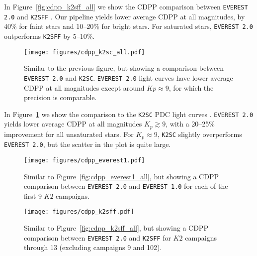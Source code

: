 \documentclass[]{emulateapj}
\newcommand{\Kp}{\ensuremath{Kp}}
\newcommand{\edited}[1]{{\color{red} #1}}
\begin{document}
In Figure~\ref{fig:cdpp_k2sff_all} we show the CDPP comparison between \texttt{EVEREST 2.0}
and \texttt{K2SFF} \citep{Vanderburg14,VanderburgJohnson14}. Our pipeline yields
lower average CDPP at all magnitudes, by 40\% for faint stars and 10--20\% for bright
stars. For saturated stars, \texttt{EVEREST 2.0} outperforms \texttt{K2SFF} by 5--10\%.

\begin{figure}[hbt]
  \begin{center}
      \texttt{[image: figures/cdpp\_k2sc\_all.pdf]}
       \caption{Similar to the previous figure, but showing a comparison between \texttt{EVEREST 2.0} and \texttt{K2SC}.
       \texttt{EVEREST 2.0} light curves have lower average CDPP at all magnitudes except around $\Kp \approx 9$, for which
       the precision is comparable.}
     \label{fig:cdpp_k2sc_all}
  \end{center}
\end{figure}

In Figure~\ref{fig:cdpp_k2sc_all} we show the comparison to the \texttt{K2SC} PDC
light curves \citep{Aigrain15,Aigrain16}. \texttt{EVEREST 2.0} yields lower average CDPP at all
magnitudes $K_p \gtrsim 9$, with a 20--25\% improvement for
all unsaturated stars. For $K_p \approx 9$, \texttt{K2SC} slightly overperforms
\texttt{EVEREST 2.0}, but the scatter in the plot is quite large.

\begin{figure}[hbt]
  \begin{center}
      \texttt{[image: figures/cdpp\_everest1.pdf]}
       \caption{Similar to Figure~\ref{fig:cdpp_everest1_all}, but showing a CDPP comparison between
       \texttt{EVEREST 2.0} and \texttt{EVEREST 1.0} for each of the first 9 $K2$ campaigns.}
     \label{fig:cdpp_everest1}
  \end{center}
\end{figure}

\begin{figure}[hbt]
  \begin{center}
      \texttt{[image: figures/cdpp\_k2sff.pdf]}
       \caption{\edited{Similar to Figure~\ref{fig:cdpp_k2sff_all}, but showing a CDPP comparison between
       \texttt{EVEREST 2.0} and \texttt{K2SFF} for $K2$ campaigns through 13 (excluding campaigns 9 and 102).}}
     \label{fig:cdpp_k2sff}
  \end{center}
\end{figure}
\end{document}
